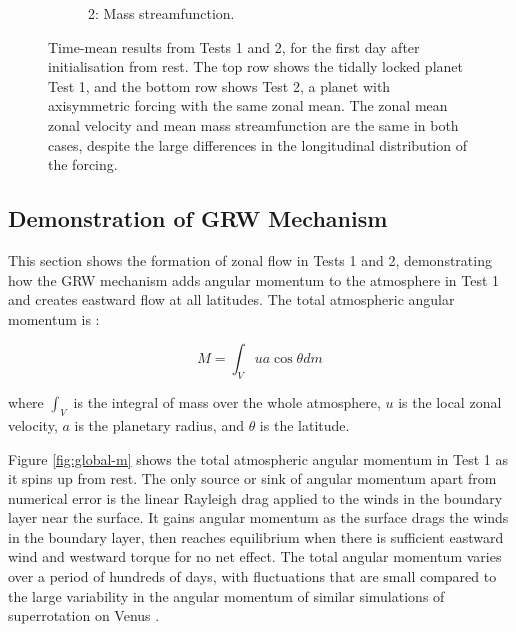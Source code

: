 \begin{figure}
\begin{subfigure}[t]{0.31\textwidth}
    \caption{2: Mass streamfunction.}
  \end{subfigure}
  \caption{Time-mean results from Tests 1 and 2, for the first day after initialisation from rest. The top row shows the tidally locked planet Test 1, and the bottom row shows Test 2, a planet with axisymmetric forcing with the same zonal mean. The zonal mean zonal velocity and mean mass streamfunction are the same in both cases, despite the large differences in the longitudinal distribution of the forcing.}\label{fig:day-1-tide-axi}
\end{figure}





%




\subsection{Demonstration of GRW Mechanism}


This section shows the formation of zonal flow in Tests 1 and 2, demonstrating how the GRW mechanism adds angular momentum to the atmosphere in Test 1 and creates eastward flow at all latitudes. The total atmospheric angular momentum is \citep{lebonnois2012momentum}:

\begin{equation}
  M=\int_{V} u a \cos \theta d m
\end{equation}

where $\int_{V}$ is the integral of mass over the whole atmosphere, $u$ is the local zonal velocity, $a$ is the planetary radius, and $\theta$ is the latitude.

Figure \ref{fig:global-m} shows the total atmospheric angular momentum in Test 1 as it spins up from rest. The only source or sink of angular momentum apart from numerical error is the linear Rayleigh drag applied to the winds in the boundary layer near the surface. It gains angular momentum as the surface drags the winds in the boundary layer, then reaches equilibrium when there is sufficient eastward wind and westward torque for no net effect. The total angular momentum varies over a period of hundreds of days, with fluctuations that are small compared to the large variability in the angular momentum of similar simulations of superrotation on Venus \citep{lebonnois2012momentum}.

